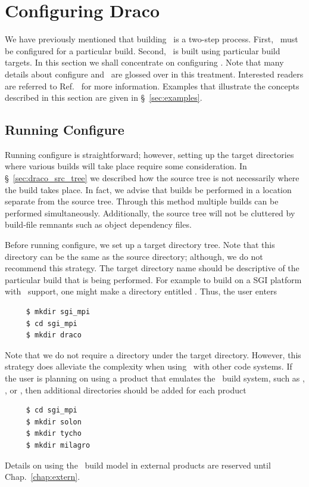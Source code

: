 
\section{Configuring Draco}
\label{sec:configuring_draco}

We have previously mentioned that building \draco\ is a two-step
process.  First, \draco\ must be configured for a particular build.
Second, \draco\ is built using particular build targets.  In this
section we shall concentrate on configuring \draco.  Note that many
details about configure and \autoconf\ are glossed over in this
treatment.  Interested readers are referred to Ref.~\cite{autoconf}
for more information.  Examples that illustrate the concepts described 
in this section are given in \S~\ref{sec:examples}.

\subsection{Running Configure}
\label{sec:running_configure}

Running configure is straightforward; however, setting up the target
directories where various builds will take place require some
consideration.  In \S~\ref{sec:draco_src_tree} we described how the
source tree is not necessarily where the build takes place.  In fact,
we advise that builds be performed in a location separate from the
source tree.  Through this method multiple builds can be performed
simultaneously.  Additionally, the source tree will not be cluttered
by build-file remnants such as object dependency files.

Before running configure, we set up a target directory tree.  Note
that this directory can be the same as the source directory; although,
we do not recommend this strategy.  The target directory name should
be descriptive of the particular build that is being performed.  For
example to build on a SGI platform with \mpi\ support, one might make
a directory entitled . Thus, the user enters
\begin{verbatim}
     $ mkdir sgi_mpi
     $ cd sgi_mpi
     $ mkdir draco
\end{verbatim} %
Note that we do not require a  directory under the target
directory.  However, this strategy does alleviate the complexity when
using \draco\ with other code systems.  If the user is planning on
using a product that emulates the \draco\ build system, such as
\solon, \tycho, or \milagro, then additional directories should be
added for each product
\begin{verbatim}
     $ cd sgi_mpi
     $ mkdir solon
     $ mkdir tycho
     $ mkdir milagro
\end{verbatim}
Details on using the \draco\ build model in external products are
reserved until Chap.~\ref{chap:extern}.

